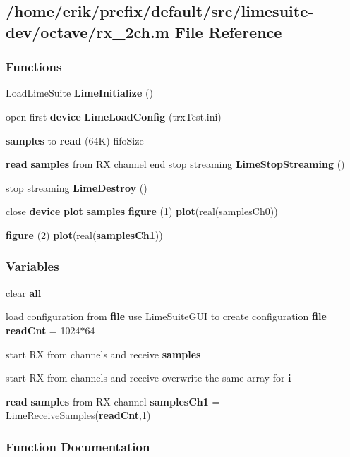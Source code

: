 \subsection{/home/erik/prefix/default/src/limesuite-\/dev/octave/rx\+\_\+2ch.m File Reference}
\label{rx__2ch_8m}
\subsubsection*{Functions}
\begin{DoxyCompactItemize}
\item 
Load\+Lime\+Suite {\bf Lime\+Initialize} ()
\item 
open first {\bf device} {\bf Lime\+Load\+Config} (\textquotesingle{}trx\+Test.\+ini\textquotesingle{})
\item 
{\bf samples} to {\bf read} (64\+K) fifo\+Size
\item 
{\bf read} {\bf samples} from RX channel end stop streaming {\bf Lime\+Stop\+Streaming} ()
\item 
stop streaming {\bf Lime\+Destroy} ()
\item 
close {\bf device} {\bf plot} {\bf samples} {\bf figure} (1) {\bf plot}(real(samples\+Ch0))
\item 
{\bf figure} (2) {\bf plot}(real({\bf samples\+Ch1}))
\end{DoxyCompactItemize}
\subsubsection*{Variables}
\begin{DoxyCompactItemize}
\item 
clear {\bf all}
\item 
load configuration from {\bf file} use Lime\+Suite\+G\+UI to create configuration {\bf file} {\bf read\+Cnt} = 1024$\ast$64
\item 
start RX from channels and receive {\bf samples}
\item 
start RX from channels and receive overwrite the same array for {\bf i}
\item 
{\bf read} {\bf samples} from RX channel {\bf samples\+Ch1} = Lime\+Receive\+Samples({\bf read\+Cnt},1)
\end{DoxyCompactItemize}


\subsubsection{Function Documentation}
